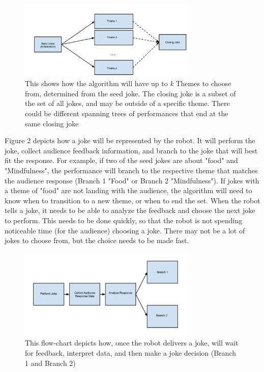 \documentclass[onecolumn, draftclsnofoot,10pt, compsoc]{IEEEtran}
\begin{document}
\begin{figure}[H]
  \centering
  \includegraphics[width=0.75\textwidth,height=0.75\textheight,keepaspectratio]{fig0}
  \caption{This shows how the algorithm will have up to \textit{k} Themes to choose from, determined from the seed joke. The closing joke is a subset of the set of all jokes, and may be outside of a specific theme. There could be different spanning trees of performances that end at the same closing joke}
\end{figure}

Figure 2 depicts how a joke will be represented by the robot. It will perform the joke, collect audience feedback information, and branch to the joke that will best fit the response. For example, if two of the seed jokes are about "food" and "Mindfulness", the performance will branch to the respective theme that matches the audience response (Branch 1 "Food" or Branch 2 "Mindfulness"). If jokes with a theme of "food" are not landing with the audience, the algorithm will need to know when to transition to a new theme, or when to end the set. When the robot tells a joke, it needs to be able to analyze the feedback and choose the next joke to perform. This needs to be done quickly, so that the robot is not spending noticeable time (for the audience) choosing a joke. There may not be a lot of jokes to choose from, but the choice needs to be made fast.

\begin{figure}[H]
  \centering
  \includegraphics[width=0.75\textwidth,height=0.75\textheight,keepaspectratio]{fig1}
  \caption{ This flow-chart depicts how, once the robot delivers a joke, will wait for feedback, interpret data, and then make a joke decision (Branch 1 and Branch 2)}
\end{figure}
\end{document}
